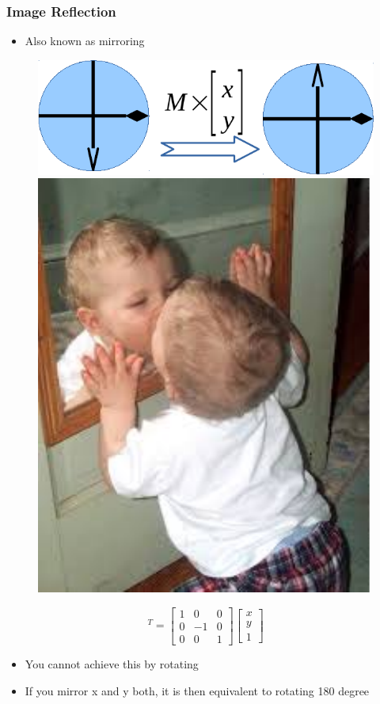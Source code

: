\begin{frame}
\frametitle {Image Reflection}
\begin{itemize}
	\item {Also known as mirroring}
\end{itemize}
\vspace{0.1in}
\begin{figure}
	{\includegraphics[width=0.55\linewidth]{./figs/imgtrans_mirr.pdf}}
	\hspace{0.15in}
	{\includegraphics[width=0.15\linewidth]{./figs/mirror.pdf}}
\end{figure}
\begin{equation}
	[x'~~y'~~1]^T=\left[ \begin{array}{ccc}
	1 & 0 & 0 \\
	0 & -1 & 0 \\
	0 & 0 & 1 
	\end{array} \right] \left[ \begin{array}{c}
	x \\
	y \\
	1
	\end{array} \right]
\end{equation}
\begin{itemize}
	\item {You cannot achieve this by rotating}
	\item {If you mirror x and y both, it is then equivalent to rotating 180 degree}
\end{itemize}
\end{frame}

